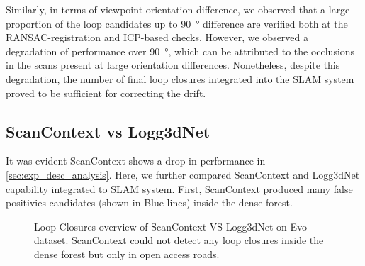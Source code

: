 Similarly, in terms of viewpoint orientation difference, we observed that a large proportion of the loop candidates up to \SI{90}{\degree} difference are verified both at the RANSAC-registration and ICP-based checks. However, we observed a degradation of performance over \SI{90}{\degree}, which can be attributed to the occlusions in the scans present at large orientation differences. Nonetheless, despite this degradation, the number of final loop closures integrated into the SLAM system proved to be sufficient for correcting the drift.   




\subsection{ScanContext vs Logg3dNet} 
It was evident ScanContext shows a drop in performance in \ref{sec:exp_desc_analysis}. Here, we further compared ScanContext and Logg3dNet capability integrated to SLAM system. First, ScanContext produced many false positivies candidates (shown in Blue lines) inside the dense forest.   


\begin{figure}[t]
  \centering
  \caption{Loop Closures overview of ScanContext VS Logg3dNet on Evo dataset. ScanContext could not detect any loop closures inside the dense forest but only in open access roads. }
  \label{fig:exp_2_3_loop_closure_comparison}
\end{figure}

